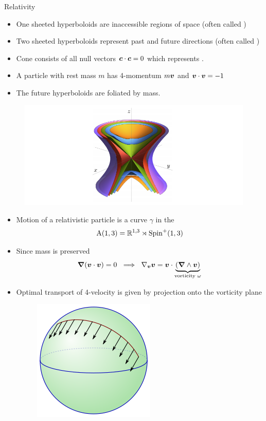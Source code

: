 \documentclass[UKenglish]{beamer}
\begin{document}
\begin{frame}{Relativity}
\vfill
\begin{itemize}
	\item One sheeted hyperboloids are inaccessible regions of space (often called )
	\item Two sheeted hyperboloids represent past and future directions (often called )
	\item Cone consists of all null vectors $\boldsymbol{c}\cdot \boldsymbol{c} = 0$ which represents .
	\item A particle with rest mass $m$ has 4-momentum $m\boldsymbol{v}$ and $\boldsymbol{v}\cdot \boldsymbol{v}=-1$
	\item The future hyperboloids are foliated by mass.
\end{itemize}
\begin{figure}[H]
\centering
\includegraphics[width=.8\textwidth]{figures/lorentzian.png}
\end{figure}
\vfill
\end{frame}

\begin{frame}{}
\vfill
\begin{itemize}
	\item Motion of a relativistic particle is a curve $\gamma$ in the 
\[
\operatorname{A}(1,3) = \mathbb{R}^{1,3}\rtimes \mathrm{Spin}^+(1,3)
\]

        \item Since mass is preserved
        \[
            \boldsymbol{\nabla} ({\boldsymbol{v}} \cdot {\boldsymbol{v}}) = 0 ~\implies~ \nabla_{\boldsymbol{v}} {\boldsymbol{v}} =  {\boldsymbol{v}}\cdot \underbrace{(\boldsymbol{\nabla} \wedge {\boldsymbol{v}})}_{\textrm{vorticity }\omega}
        \]
        \item Optimal transport of 4-velocity is given by projection onto the vorticity plane
        \begin{figure}
            \centering
            \includegraphics[width=.2\textwidth]{figures/parallel_transport.png}
        \end{figure}
        \end{itemize}
\vfill
\end{frame}
\end{document}
